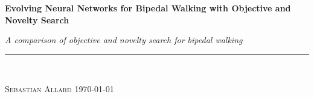 
\vspace*{5cm}

\begin{flushleft}
\Huge \textsf{\textbf{Evolving Neural Networks for Bipedal Walking with Objective and Novelty Search}}
\end{flushleft}

\emph{\large A comparison of objective and novelty search for bipedal walking} \hfill \\
\rule{\textwidth}{1pt} \\

\begin{flushright}
\textsc{Sebastian Allard} \quad \today
\end{flushright}


\thispagestyle{empty}
